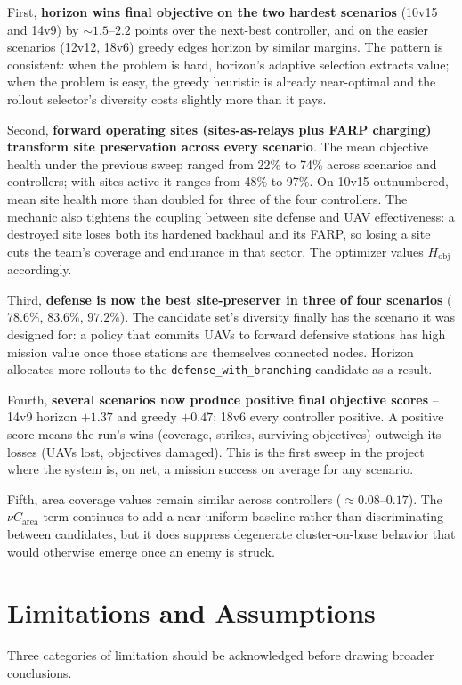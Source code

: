 \documentclass[conference]{IEEEtran}
\begin{document}
First, \textbf{horizon wins final objective on the two hardest scenarios}
(10v15 and 14v9) by $\sim$$1.5$--$2.2$ points over the next-best
controller, and on the easier scenarios (12v12, 18v6) greedy edges horizon
by similar margins. The pattern is consistent: when the problem is hard,
horizon's adaptive selection extracts value; when the problem is easy, the
greedy heuristic is already near-optimal and the rollout selector's
diversity costs slightly more than it pays.

Second, \textbf{forward operating sites (sites-as-relays plus FARP
charging) transform site preservation across every scenario}. The mean
objective health under the previous sweep ranged from 22\% to 74\% across
scenarios and controllers; with sites active it ranges from 48\% to 97\%.
On 10v15 outnumbered, mean site health more than doubled for three of the
four controllers. The mechanic also tightens the coupling between site
defense and UAV effectiveness: a destroyed site loses both its hardened
backhaul and its FARP, so losing a site cuts the team's coverage and
endurance in that sector. The optimizer values $H_{\text{obj}}$ accordingly.

Third, \textbf{defense is now the best site-preserver in three of four
scenarios} ($78.6\%$, $83.6\%$, $97.2\%$). The candidate set's diversity
finally has the scenario it was designed for: a policy that commits UAVs
to forward defensive stations has high mission value once those stations
are themselves connected nodes. Horizon allocates more rollouts to the
\texttt{defense\_with\_branching} candidate as a result.

Fourth, \textbf{several scenarios now produce positive final objective
scores} -- 14v9 horizon $+1.37$ and greedy $+0.47$; 18v6 every controller
positive. A positive score means the run's wins (coverage, strikes,
surviving objectives) outweigh its losses (UAVs lost, objectives damaged).
This is the first sweep in the project where the system is, on net, a
mission success on average for any scenario.

Fifth, area coverage values remain similar across controllers
($\approx 0.08$--$0.17$). The $\nu C_{\text{area}}$ term continues to add a
near-uniform baseline rather than discriminating between candidates, but
it does suppress degenerate cluster-on-base behavior that would otherwise
emerge once an enemy is struck.

\section{Limitations and Assumptions}
Three categories of limitation should be acknowledged before drawing
broader conclusions.
\end{document}
